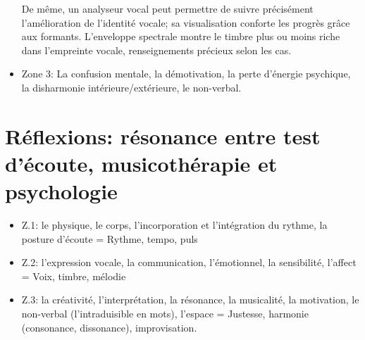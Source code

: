 \begin{itemize}
                            De même, un analyseur vocal peut permettre de suivre précisément l'amélioration de
                            l'identité vocale; sa visualisation conforte les progrès grâce aux
                            formants. L'enveloppe spectrale montre le timbre plus ou moins riche
                            dans l'empreinte vocale, renseignements précieux selon les cas.

                            	\item Zone 3: La confusion mentale, la démotivation, la perte d'énergie
                            psychique, la disharmonie intérieure/extérieure, le non-verbal.
                            \end{itemize}







        \section{Réflexions: résonance entre test d'écoute, musicothérapie et
                              psychologie}

                            \begin{itemize}
                             \item  Z.1: le physique, le corps, l'incorporation et
                            l'intégration du rythme,
                            la posture d'écoute  =  Rythme, tempo, puls

                            \item  Z.2:  l'expression vocale, la communication,
                            l'émotionnel, la sensibilité, l'affect = Voix, timbre, mélodie

                            \item Z.3: la créativité, l'interprétation, la
                            résonance, la musicalité, la motivation, le non-verbal (l'intraduisible en mots), l'espace = Justesse, harmonie (consonance,
                            dissonance), improvisation.
                            \end{itemize}

